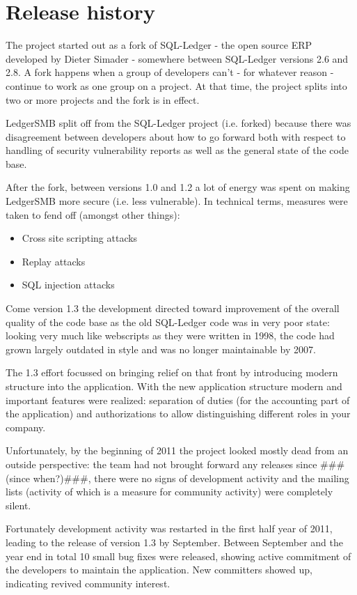 \documentclass[10pt,A4]{book}
\begin{document}
\section{Release history}

The project started out as a fork of SQL-Ledger - the open source ERP
developed by Dieter Simader - somewhere between SQL-Ledger versions 2.6
and 2.8.  A fork happens when a group of developers can't - for whatever
reason - continue to work as one group on a project.  At that time, the
project splits into two or more projects and the fork is in effect.

LedgerSMB split off from the SQL-Ledger project (i.e. forked) because
there was disagreement between developers about how to go forward both with
respect to handling of security vulnerability reports as well as the general
state of the code base.

After the fork, between versions 1.0 and 1.2 a lot of energy was spent on
making LedgerSMB more secure (i.e. less vulnerable).  In technical terms,
measures were taken to fend off (amongst other things):

\begin{itemize}
\item Cross site scripting attacks
\item Replay attacks
\item SQL injection attacks
\end{itemize}

Come version 1.3 the development directed toward improvement of the overall
quality of the code base as the old SQL-Ledger code was in very poor state:
looking very much like webscripts as they were written in 1998, the code had
grown largely outdated in style and was no longer maintainable by 2007.

The 1.3 effort focussed on bringing relief on that front by introducing
modern structure into the application.  With the new application structure
modern and important features were realized: separation of duties (for the
accounting part of the application) and authorizations to allow distinguishing
different roles in your company.

Unfortunately, by the beginning of 2011 the project looked mostly dead from
an outside perspective: the team had not brought forward any releases since
\#\#\#(since when?)\#\#\#, there were no signs of development activity and the
mailing lists (activity of which is a measure for community activity) were
completely silent.

Fortunately development activity was restarted in the first half year of 2011,
leading to the release of version 1.3 by September.  Between September and the
year end in total 10 small bug fixes were released, showing active commitment
of the developers to maintain the application.  New committers showed up, indicating
revived community interest.
\end{document}
